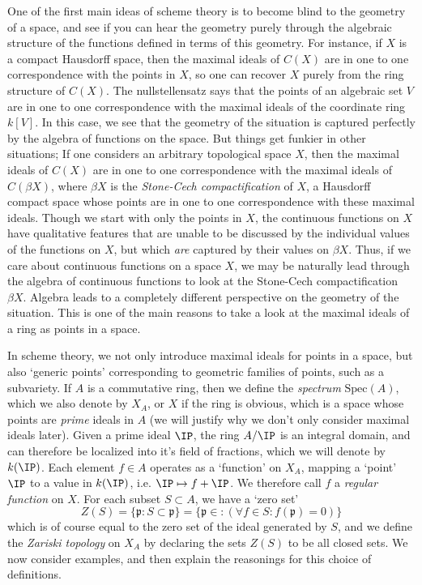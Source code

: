 One of the first main ideas of scheme theory is to become blind to the geometry of a space, and see if you can hear the geometry purely through the algebraic structure of the functions defined in terms of this geometry. For instance, if $X$ is a compact Hausdorff space, then the maximal ideals of $C(X)$ are in one to one correspondence with the points in $X$, so one can recover $X$ purely from the ring structure of $C(X)$. The nullstellensatz says that the points of an algebraic set $V$ are in one to one correspondence with the maximal ideals of the coordinate ring $k[V]$. In this case, we see that the geometry of the situation is captured perfectly by the algebra of functions on the space. But things get funkier in other situations; If one considers an arbitrary topological space $X$, then the maximal ideals of $C(X)$ are in one to one correspondence with the maximal ideals of $C(\beta X)$, where $\beta X$ is the {\it Stone-Cech compactification} of $X$, a Hausdorff compact space whose points are in one to one correspondence with these maximal ideals. Though we start with only the points in $X$, the continuous functions on $X$ have qualitative features that are unable to be discussed by the individual values of the functions on $X$, but which {\it are} captured by their values on $\beta X$. Thus, if we care about continuous functions on a space $X$, we may be naturally lead through the algebra of continuous functions to look at the Stone-Cech compactification $\beta X$. Algebra leads to a completely different perspective on the geometry of the situation. This is one of the main reasons to take a look at the maximal ideals of a ring as points in a space.

In scheme theory, we not only introduce maximal ideals for points in a space, but also `generic points' corresponding to geometric families of points, such as a subvariety. If $A$ is a commutative ring, then we define the \emph{spectrum} $\text{Spec}(A)$, which we also denote by $X_A$, or $X$ if the ring is obvious, which is a space whose points are {\it prime} ideals in $A$ (we will justify why we don't only consider maximal ideals later). Given a prime ideal $\IP$, the ring $A/\IP$ is an integral domain, and can therefore be localized into it's field of fractions, which we will denote by $k(\IP)$. Each element $f \in A$ operates as a `function' on $X_A$, mapping a `point' $\IP$ to a value in $k(\IP)$, i.e. $\IP \mapsto f + \IP$. We therefore call $f$ a \emph{regular function} on $X$. For each subset $S \subset A$, we have a `zero set'
%
\[ Z(S) = \{ \mathfrak{p}: S \subset \mathfrak{p} \} = \{ \mathfrak{p} \in : (\forall f \in S: f(\mathfrak{p}) = 0) \} \]
%
which is of course equal to the zero set of the ideal generated by $S$, and we define the \emph{Zariski topology} on $X_A$ by declaring the sets $Z(S)$ to be all closed sets. We now consider examples, and then explain the reasonings for this choice of definitions.

